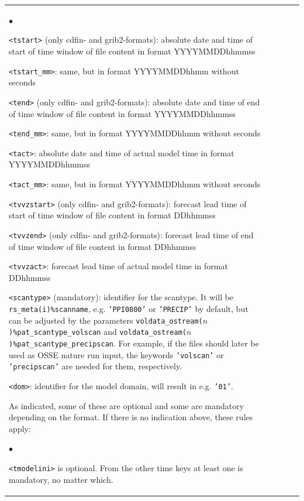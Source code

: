\documentclass[10pt,a4paper,twoside,headinclude,footinclude,parskip=half]{scrartcl}
\newcommand{\paramform}[1]{\mbox{\texttt{#1}}\xspace}%
\newlength{\lenspeins}%
\newlength{\lenspzwei}%
\newlength{\lenspdrei}%
\newlength{\lenspvier}%
\newlength{\lenspfunf}%
\newenvironment{tabitemize}
{\begin{list}{$\bullet$}{
    \setlength{\labelwidth}{\widthof{2 =}}
    \setlength{\labelsep}{1ex}
    \setlength{\leftmargin}{\labelwidth+\labelsep}
    \setlength{\itemsep}{0.2em plus 0.1em minus 0.2em}
    \setlength{\parsep}{0mm}
    \setlength{\topsep}{0.2em plus 0.1em minus 0.2em}
    \setlength{\partopsep}{0mm}
  }}{
\end{list}}%
\begin{document}
\begin{small}
\begin{longtable}{|p{\lenspeins}p{\lenspzwei}|p{\lenspdrei}|p{\lenspvier}<{\vspace*{\extrarowheight}}|p{\lenspfunf}|}
{\begin{tabitemize}
              \item \paramform{<tstart>} (only cdfin- and grib2-formats): absolute date and time of start of time window of file content in format YYYYMMDDhhmmss
              \item \paramform{<tstart_mm>}: same, but in format YYYYMMDDhhmm without seconds
              \item \paramform{<tend>} (only cdfin- and grib2-formats): absolute date and time of end of time window of file content in format YYYYMMDDhhmmss
              \item \paramform{<tend_mm>}: same, but in format YYYYMMDDhhmm without seconds
              \item \paramform{<tact>}: absolute date and time of actual model time in format YYYYMMDDhhmmss
              \item \paramform{<tact_mm>}: same, but in format YYYYMMDDhhmm without seconds
              \item \paramform{<tvvzstart>} (only cdfin- and grib2-formats): forecast lead time of start of time window of file content in format DDhhmmss
              \item \paramform{<tvvzend>} (only cdfin- and grib2-formats): forecast lead time of end of time window of file content in format DDhhmmss
              \item \paramform{<tvvzact>}: forecast lead time of actual model time in format DDhhmmss
              \item \paramform{<scantype>} (mandatory): identifier for the scantype. It will be \paramform{rs_meta(i)\%scanname}, e.g. \paramform{'PPI0800'} or \paramform{'PRECIP'}
                by default, but can be adjusted by the parameters \paramform{voldata_ostream($n$)\%pat_scantype_volscan} and \paramform{voldata_ostream($n$)\%pat_scantype_precipscan}.
                For example, if the files should later be used as OSSE nature run input, the keywords \paramform{'volscan'} or \paramform{'precipscan'} are needed for them, respectively.
              \item \paramform{<dom>}: identifier for the model domain, will result in e.g. \paramform{'01'}.
            \end{tabitemize}
            As indicated, some of these are optional and some are mandatory depending on the format. If there is no indication above, these rules apply: 
            \begin{tabitemize}
            \item[-] \paramform{<tmodelini>} is optional. From the other time keys at least one is mandatory, no matter which.

\end{tabitemize}}
\end{longtable}
\end{small}
\end{document}

